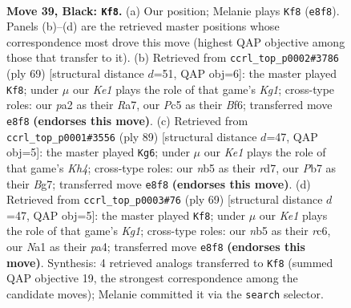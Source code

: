 \documentclass[11pt]{article}
\begin{document}
\clearpage

\begin{figure}[p]\centering
\begin{subfigure}{0.46\textwidth}\centering
\resizebox{\linewidth}{!}{%
\newchessgame
\chessboard[
  setfen={4k3/1p2p1rp/n5p1/pNp5/5P1P/2P2P2/P7/n1BR1K2 b - - 4 39},
  showmover=false,
  pgfstyle=straightmove, color=movearrow, markmove={e8-f8}
]}
\caption{}
\end{subfigure}\hfill
\begin{subfigure}{0.46\textwidth}\centering
\resizebox{\linewidth}{!}{%
\newchessgame
\chessboard[
  setfen={6k1/r5p1/5b1p/2pnpP1P/1pN5/6P1/1PB2P2/2R3K1 b - - 0 35},
  showmover=false,
  pgfstyle=straightmove, color=movearrow, markmove={g8-f8}
]}
\caption{}
\end{subfigure}
\\[4pt]
\begin{subfigure}{0.46\textwidth}\centering
\resizebox{\linewidth}{!}{%
\newchessgame
\chessboard[
  setfen={8/3R2b1/p1r2p2/6pk/P1p2p2/2P1nP2/1P5N/1KR5 b - - 2 45},
  showmover=false,
  pgfstyle=straightmove, color=movearrow, markmove={h5-g6}
]}
\caption{}
\end{subfigure}\hfill
\begin{subfigure}{0.46\textwidth}\centering
\resizebox{\linewidth}{!}{%
\newchessgame
\chessboard[
  setfen={6k1/r5p1/2R1p2p/p2n3P/Pp6/8/1P2BPP1/6K1 b - - 1 35},
  showmover=false,
  pgfstyle=straightmove, color=movearrow, markmove={g8-f8}
]}
\caption{}
\end{subfigure}
\caption{\textbf{Move 39, Black: \texttt{Kf8}.} (a) Our position; Melanie plays \texttt{Kf8} (\texttt{e8f8}). Panels (b)--(d) are the retrieved master positions whose correspondence most drove this move (highest QAP objective among those that transfer to it). (b) Retrieved from \texttt{ccrl\_top\_p0002\#3786} (ply 69) [structural distance $d$=51, QAP obj=6]: the master played \texttt{Kf8}; under $\mu$ our \emph{Ke1} plays the role of that game's \emph{Kg1}; cross-type roles: our \emph{p}a2 as their \emph{R}a7, our \emph{P}c5 as their \emph{B}f6; transferred move \texttt{e8f8} \textbf{(endorses this move)}. (c) Retrieved from \texttt{ccrl\_top\_p0001\#3556} (ply 89) [structural distance $d$=47, QAP obj=5]: the master played \texttt{Kg6}; under $\mu$ our \emph{Ke1} plays the role of that game's \emph{Kh4}; cross-type roles: our \emph{n}b5 as their \emph{r}d7, our \emph{P}b7 as their \emph{B}g7; transferred move \texttt{e8f8} \textbf{(endorses this move)}. (d) Retrieved from \texttt{ccrl\_top\_p0003\#76} (ply 69) [structural distance $d$=47, QAP obj=5]: the master played \texttt{Kf8}; under $\mu$ our \emph{Ke1} plays the role of that game's \emph{Kg1}; cross-type roles: our \emph{n}b5 as their \emph{r}c6, our \emph{N}a1 as their \emph{p}a4; transferred move \texttt{e8f8} \textbf{(endorses this move)}. Synthesis: 4 retrieved analogs transferred to \texttt{Kf8} (summed QAP objective 19, the strongest correspondence among the candidate moves); Melanie committed it via the \texttt{search} selector.}
\label{fig:thought-m77}
\end{figure}
\end{document}
